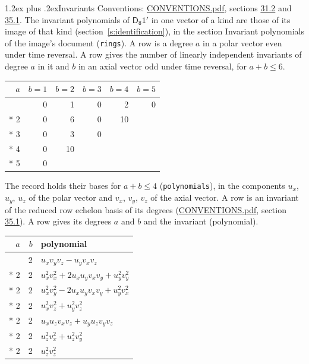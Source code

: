 \documentclass[10pt,a4paper]{article}
\makeatletter
\renewcommand\section{\@startsection{section}{1}{\z@}{-3ex plus -1ex minus -.2ex}%
  {1.2ex plus .2ex}{\normalfont\large\sffamily\bfseries\color{parttitle}}}
\numberwithin{equation}{section}
\newcommand{\grp}[1]{\mathsf{#1}}
\makeatother
\begin{document}
\section{Invariants}\label{s:invariants}
Conventions: \href{../../CONVENTIONS.pdf}{CONVENTIONS.pdf}, sections \href{../../CONVENTIONS.pdf\#conv.31.2}{31.2} and \href{../../CONVENTIONS.pdf\#conv.35.1}{35.1}.
The invariant polynomials of $\grp{D_{8}1'}$ in one vector of a kind are those of its image of that kind (section~\ref{s:identification}), in the section Invariant polynomials of the image's document (\texttt{rings}).
\leavevmode\label{n:index.degree.polar}\label{n:index.degree.axial}A row is a degree $a$ in a polar vector even under time reversal. A row gives the number of linearly independent invariants of degree $a$ in it and $b$ in an axial vector odd under time reversal, for $a + b \le 6$.
{\small\begin{longtable}{@{}rrrrrr@{}}\toprule
$a$ & $b = 1$ & $b = 2$ & $b = 3$ & $b = 4$ & $b = 5$\\\midrule\endhead
\bottomrule\endfoot\endlastfoot
1 & 0 & 1 & 0 & 2 & 0\\*
2 & 0 & 6 & 0 & 10 & \\*
3 & 0 & 3 & 0 &  & \\*
4 & 0 & 10 &  &  & \\*
5 & 0 &  &  &  & \\
\bottomrule\end{longtable}}
\leavevmode\label{n:local.component.polar}\label{n:local.component.axial}The record holds their bases for $a + b \le 4$ (\texttt{polynomials}), in the components $u_{x}$, $u_{y}$, $u_{z}$ of the polar vector and $v_{x}$, $v_{y}$, $v_{z}$ of the axial vector. \label{n:head.polynomial}A row is an invariant of the reduced row echelon basis of its degrees (\href{../../CONVENTIONS.pdf}{CONVENTIONS.pdf}, section \href{../../CONVENTIONS.pdf\#conv.35.1}{35.1}). A row gives its degrees $a$ and $b$ and the invariant (polynomial).
{\small\renewcommand{\arraystretch}{1.2}\begin{longtable}{@{}rrl@{}}\toprule
$a$ & $b$ & polynomial\\\midrule\endhead
\bottomrule\endfoot\endlastfoot
1 & 2 & $u_{x}v_{y}v_{z} - u_{y}v_{x}v_{z}$\\*
2 & 2 & $u_{x}^{2}v_{x}^{2} + 2u_{x}u_{y}v_{x}v_{y} + u_{y}^{2}v_{y}^{2}$\\*
2 & 2 & $u_{x}^{2}v_{y}^{2} - 2u_{x}u_{y}v_{x}v_{y} + u_{y}^{2}v_{x}^{2}$\\*
2 & 2 & $u_{x}^{2}v_{z}^{2} + u_{y}^{2}v_{z}^{2}$\\*
2 & 2 & $u_{x}u_{z}v_{x}v_{z} + u_{y}u_{z}v_{y}v_{z}$\\*
2 & 2 & $u_{z}^{2}v_{x}^{2} + u_{z}^{2}v_{y}^{2}$\\*
2 & 2 & $u_{z}^{2}v_{z}^{2}$\\
\bottomrule\end{longtable}}
\end{document}
